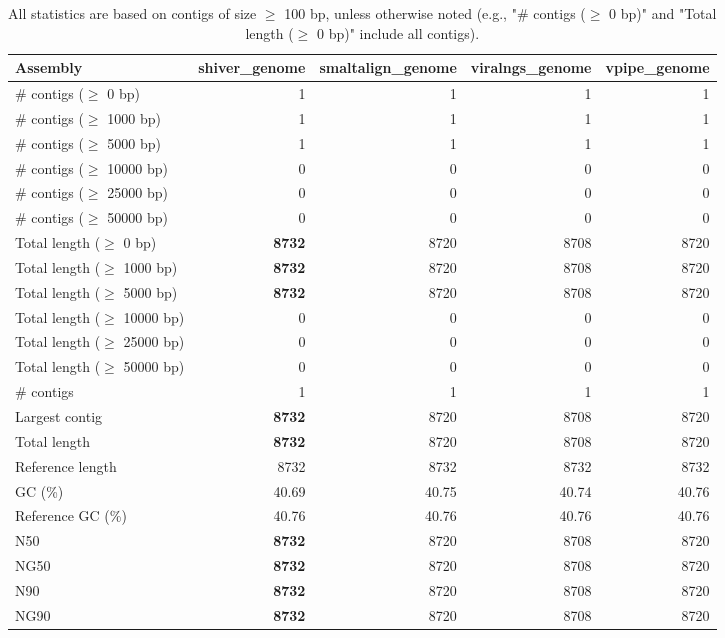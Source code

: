 \documentclass[12pt,a4paper]{article}
\begin{document}
\begin{table}[ht]
\begin{center}
\caption{All statistics are based on contigs of size $\geq$ 100 bp, unless otherwise noted (e.g., "\# contigs ($\geq$ 0 bp)" and "Total length ($\geq$ 0 bp)" include all contigs).}
\begin{tabular}{|l*{4}{|r}|}
\hline
Assembly & shiver\_genome & smaltalign\_genome & viralngs\_genome & vpipe\_genome \\ \hline
\# contigs ($\geq$ 0 bp) & 1 & 1 & 1 & 1 \\ \hline
\# contigs ($\geq$ 1000 bp) & 1 & 1 & 1 & 1 \\ \hline
\# contigs ($\geq$ 5000 bp) & 1 & 1 & 1 & 1 \\ \hline
\# contigs ($\geq$ 10000 bp) & 0 & 0 & 0 & 0 \\ \hline
\# contigs ($\geq$ 25000 bp) & 0 & 0 & 0 & 0 \\ \hline
\# contigs ($\geq$ 50000 bp) & 0 & 0 & 0 & 0 \\ \hline
Total length ($\geq$ 0 bp) & {\bf 8732} & 8720 & 8708 & 8720 \\ \hline
Total length ($\geq$ 1000 bp) & {\bf 8732} & 8720 & 8708 & 8720 \\ \hline
Total length ($\geq$ 5000 bp) & {\bf 8732} & 8720 & 8708 & 8720 \\ \hline
Total length ($\geq$ 10000 bp) & 0 & 0 & 0 & 0 \\ \hline
Total length ($\geq$ 25000 bp) & 0 & 0 & 0 & 0 \\ \hline
Total length ($\geq$ 50000 bp) & 0 & 0 & 0 & 0 \\ \hline
\# contigs & 1 & 1 & 1 & 1 \\ \hline
Largest contig & {\bf 8732} & 8720 & 8708 & 8720 \\ \hline
Total length & {\bf 8732} & 8720 & 8708 & 8720 \\ \hline
Reference length & 8732 & 8732 & 8732 & 8732 \\ \hline
GC (\%) & 40.69 & 40.75 & 40.74 & 40.76 \\ \hline
Reference GC (\%) & 40.76 & 40.76 & 40.76 & 40.76 \\ \hline
N50 & {\bf 8732} & 8720 & 8708 & 8720 \\ \hline
NG50 & {\bf 8732} & 8720 & 8708 & 8720 \\ \hline
N90 & {\bf 8732} & 8720 & 8708 & 8720 \\ \hline
NG90 & {\bf 8732} & 8720 & 8708 & 8720 \\ \hline

\end{tabular}
\end{center}
\end{table}
\end{document}
